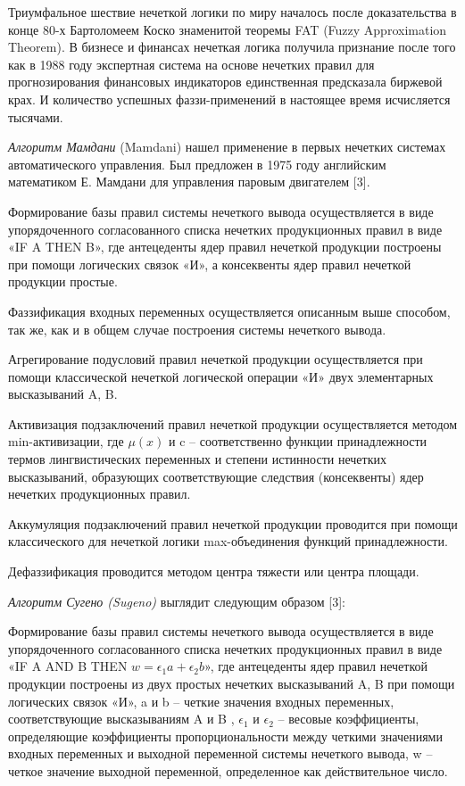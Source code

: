 Триумфальное шествие нечеткой логики по миру началось после доказательства в конце 80-х Бартоломеем Коско знаменитой теоремы FAT (Fuzzy Approximation Theorem).
В бизнесе и финансах нечеткая логика получила признание после того как в 1988 году экспертная система на основе нечетких правил для прогнозирования финансовых
индикаторов единственная предсказала биржевой крах. И количество успешных фаззи-применений в настоящее время исчисляется тысячами.


\textit{Алгоритм Мамдани }(Mamdani) нашел применение в первых нечетких системах автоматического управления. Был предложен в 1975 году английским математиком Е. Мамдани для управления паровым двигателем [3].

Формирование базы правил системы нечеткого вывода осуществляется в виде упорядоченного согласованного списка нечетких продукционных правил в виде «IF A THEN B», где антецеденты ядер правил нечеткой продукции построены при помощи логических связок «И», а консеквенты ядер правил нечеткой продукции простые.

Фаззификация входных переменных осуществляется описанным выше способом, так же, как и в общем случае построения системы нечеткого вывода.

Агрегирование подусловий правил нечеткой продукции осуществляется при помощи классической нечеткой логической операции «И» двух элементарных высказываний A, B.

Активизация подзаключений правил нечеткой продукции осуществляется методом min-активизации, где $\mu (x)$ и c – соответственно функции принадлежности термов лингвистических переменных и степени истинности нечетких высказываний, образующих соответствующие следствия (консеквенты) ядер нечетких продукционных правил.

Аккумуляция подзаключений правил нечеткой продукции проводится при помощи классического для нечеткой логики max-объединения функций принадлежности.

Дефаззификация проводится методом центра тяжести или центра площади.

\textit{Алгоритм Сугено (Sugeno)} выглядит следующим образом [3]:

Формирование базы правил системы нечеткого вывода осуществляется в виде упорядоченного согласованного списка нечетких продукционных правил в виде «IF A AND B THEN $w=\epsilon_1 a + \epsilon_2 b $», где антецеденты ядер правил нечеткой продукции построены из двух простых нечетких высказываний A, B при помощи логических связок «И», a и b – четкие значения входных переменных, соответствующие высказываниям A и B , $\epsilon_1$ и $\epsilon_2$ – весовые коэффициенты, определяющие коэффициенты пропорциональности между четкими значениями входных переменных и выходной переменной системы нечеткого вывода, w – четкое значение выходной переменной, определенное как действительное число.

